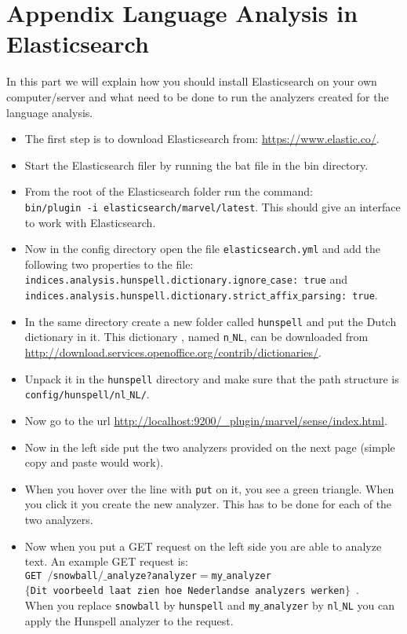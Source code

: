 \section{Appendix Language Analysis in Elasticsearch} \label{app:irjasper}
In this part we will explain how you should install Elasticsearch on your own computer/server and what need to be done to run the analyzers created for the language analysis.
\begin{itemize}
\item The first step is to download Elasticsearch from: \url{ https://www.elastic.co/}.
\item Start the Elasticsearch filer by running the bat file in the bin directory.
\item From the root of the Elasticsearch folder run the command: \\
\texttt{bin/plugin -i elasticsearch/marvel/latest}. This should give an interface to work with Elasticsearch.
\item Now in the config directory open the file \texttt{elasticsearch.yml} and add the following two properties to the file: 
\texttt{indices.analysis.hunspell.dictionary.ignore$\_$case: true} and \texttt{indices.analysis.hunspell.dictionary.strict$\_$affix$\_$parsing: true}. 
\item In the same directory create a new folder called \texttt{hunspell} and put the Dutch dictionary in it. This dictionary , named \texttt{n$\_$NL}, can be downloaded from \\
\url{http://download.services.openoffice.org/contrib/dictionaries/}.
\item Unpack it in the \texttt{hunspell} directory and make sure that the path structure is\\
 \texttt{config/hunspell/nl$\_$NL/}.
\item Now go to the url \url{http://localhost:9200/_plugin/marvel/sense/index.html}.
\item Now in the left side put the two analyzers provided on the next page (simple copy and paste would work).
\item When you hover over the line with \texttt{put} on it, you see a green triangle. When you click it you create the new analyzer. This has to be done for each of the two analyzers.
\item Now when you put a GET request on the left side you are able to analyze text. An example GET request is:\\
\texttt{GET $/$snowball$/$$\_$analyze?analyzer$=$my$\_$analyzer }\\
\texttt{$\{$Dit voorbeeld laat zien hoe Nederlandse analyzers werken$\}$ }.\\
When you replace \texttt{snowball} by \texttt{hunspell} and \texttt{my$\_$analyzer} by \texttt{nl$\_$NL} you can apply the Hunspell analyzer to the request. 
\end{itemize}
\newpage

